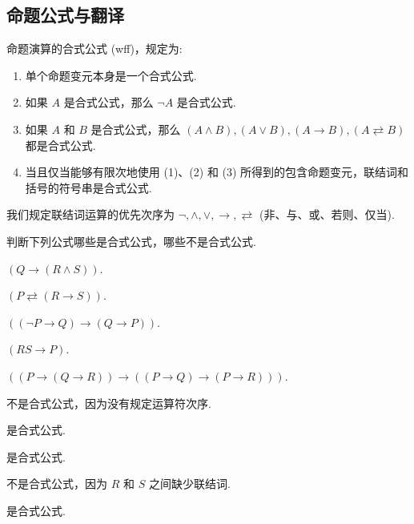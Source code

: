 \subsection{命题公式与翻译}

\begin{definition}
    命题演算的合式公式 (wff)，规定为:
    \begin{enumerate}[label=(\arabic{*})]
        \item 单个命题变元本身是一个合式公式.
        \item 如果 $A$ 是合式公式，那么 $\neg A$ 是合式公式.
        \item 如果 $A$ 和 $B$ 是合式公式，那么 $(A\wedge B),(A\vee B),(A\to B),(A \rightleftarrows B)$ 都是合式公式.
        \item 当且仅当能够有限次地使用 (1)、(2) 和 (3) 所得到的包含命题变元，联结词和括号的符号串是合式公式.
    \end{enumerate}
\end{definition}

\begin{definition}[联结词运算优先级]
    我们规定联结词运算的优先次序为 $\neg,\wedge,\vee,\to,\rightleftarrows$ (非、与、或、若则、仅当).
\end{definition}

\begin{example}
    判断下列公式哪些是合式公式，哪些不是合式公式.
    \begin{enumerate*}[label=(\arabic{*})]
        \item $(Q\to (R\wedge S))$.
        \item $(P\rightleftarrows (R\to S))$.
        \item $((\neg P\to Q)\to (Q\to P))$.
        \item $(RS\to P)$.
        \item $((P\to(Q\to R))\to((P\to Q)\to(P\to R)))$.
    \end{enumerate*}
\end{example}
\begin{solution}
    \begin{enumerate*}[label=(\arabic{*})]
        \item 不是合式公式，因为没有规定运算符次序.
        \item 是合式公式.
        \item 是合式公式.
        \item 不是合式公式，因为 $R$ 和 $S$ 之间缺少联结词.
        \item 是合式公式.
    \end{enumerate*}
\end{solution}

